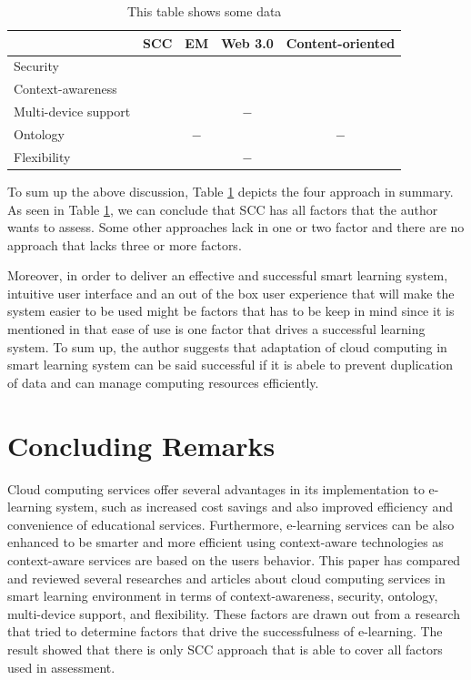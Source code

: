 \documentclass[journal]{vgtc}
\newcommand{\cmark}{\ding{51}}%
\begin{document}
\begin{table}[htb]
  \caption{This table shows some data}
  \label{tab:comparison}
  \scriptsize
  \begin{center}
  \begin{tabular}{lcccc}
     & SCC & EM & Web 3.0 & Content-oriented \\
    \hline
    Security & \cmark & \cmark & \cmark & \cmark \\
    Context-awareness & \cmark & \cmark & \cmark & \cmark \\
    Multi-device support & \cmark & \cmark & $-$ & \cmark \\
    Ontology & \cmark & $-$ & \cmark &  $-$ \\
    Flexibility & \cmark & \cmark &  $-$ & \cmark
  \end{tabular}
  \end{center}
\end{table}

To sum up the above discussion, Table \ref{tab:comparison} depicts the four approach in summary. As seen in Table \ref{tab:comparison}, we can conclude that SCC has all factors that the author wants to assess. Some other approaches lack in one or two factor and there are no approach that lacks three or more factors.

Moreover, in order to deliver an effective and successful smart learning system, intuitive user interface and an out of the box user experience that will make the system easier to be used might be factors that has to be keep in mind since it is mentioned in \cite{Sun2008} that ease of use is one factor that drives a successful learning system. To sum up, the author suggests that adaptation of cloud computing in smart learning system can be said successful if it is abele to prevent duplication of data and can manage computing resources efficiently.

\section{Concluding Remarks}
Cloud computing services offer several advantages in its implementation to e-learning system, such as increased cost savings and also improved efficiency and convenience of educational services. Furthermore, e-learning services can be also enhanced to be smarter and more efficient using context-aware technologies as context-aware services are based on the users behavior. This paper has compared and reviewed several researches and articles about cloud computing services in smart learning environment in terms of context-awareness, security, ontology, multi-device support, and flexibility. These factors are drawn out from a research that tried to determine factors that drive the successfulness of e-learning\cite{Sun2008}. The result showed that there is only SCC approach that is able to cover all factors used in assessment.
\end{document}
